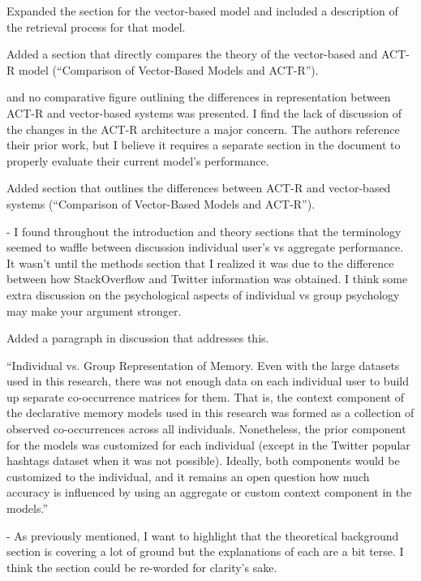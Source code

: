 \documentclass[answers,12pt]{exam}
\begin{document}
\begin{questions}
\begin{solution}
Expanded the section for the vector-based model and included a description of the retrieval process for that model.

Added a section that directly compares the theory of the vector-based and ACT-R model (``Comparison of Vector-Based Models and ACT-R'').
\end{solution}

\question and no comparative figure outlining the differences in representation between ACT-R and vector-based systems was presented. I find the lack of discussion of the changes in the ACT-R architecture a major concern. The authors reference their prior work, but I believe it requires a separate section in the document to properly evaluate their current model's performance. 

\begin{solution}
Added section that outlines the differences between ACT-R and vector-based systems (``Comparison of Vector-Based Models and ACT-R'').
\end{solution}

\question - I found throughout the introduction and theory sections that the terminology seemed to waffle between discussion individual user's vs aggregate performance. It wasn't until the methods section that I realized it was due to the difference between how StackOverflow and Twitter information was obtained. I think some extra discussion on the psychological aspects of individual vs group psychology may make your argument stronger. 

\begin{solution}
 Added a paragraph in discussion that addresses this.

 ``Individual vs. Group Representation of Memory. Even with the large datasets used in this research, there was not enough data on each individual user to build up separate co-occurrence matrices for them. That is, the context component of the declarative memory models used in this research was formed as a collection of observed co-occurrences across all individuals. Nonetheless, the prior component for the models was customized for each individual (except in the Twitter popular hashtags dataset when it was
not possible). Ideally, both components would be customized to the individual, and it remains an open question how much accuracy is influenced by using an aggregate or custom context component in the models.''
\end{solution}

\question - As previously mentioned, I want to highlight that the theoretical background section is covering a lot of ground but the explanations of each are a bit terse. I think the section could be re-worded for clarity's sake.


\end{questions}
\end{document}
